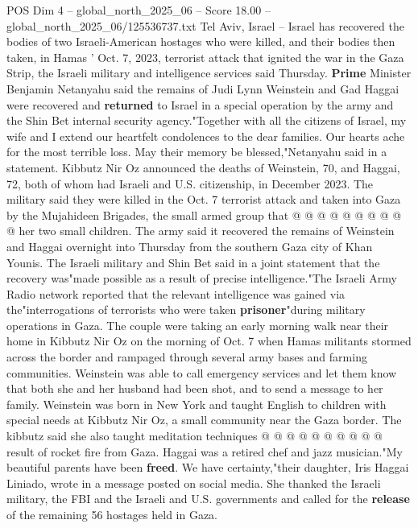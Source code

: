 \begin{textsample}{POS Dim 4 – global\_north\_2025\_06 – Score 18.00 – global\_north\_2025\_06/125536737.txt}  \label{ex:f4_pos_384}
Tel Aviv, Israel -- Israel has recovered the bodies of two Israeli-American hostages who were killed, and their bodies then taken, in Hamas ' Oct. 7, 2023, terrorist attack that ignited the war in the Gaza Strip, the Israeli military and intelligence services said Thursday. \textbf{Prime} Minister Benjamin Netanyahu said the remains of Judi Lynn Weinstein and Gad Haggai were recovered and \textbf{returned} to Israel in a special operation by the army and the Shin Bet internal security agency."Together with all the citizens of Israel, my wife and I extend our heartfelt condolences to the dear families.
Our hearts ache for the most terrible loss.
May their memory be blessed,"Netanyahu said in a statement.
Kibbutz Nir Oz announced the deaths of Weinstein, 70, and Haggai, 72, both of whom had Israeli and U.S. citizenship, in December 2023.
The military said they were killed in the Oct. 7 terrorist attack and taken into Gaza by the Mujahideen Brigades, the small armed group that @ @ @ @ @ @ @ @ @ @ her two small children.
The army said it recovered the remains of Weinstein and Haggai overnight into Thursday from the southern Gaza city of Khan Younis.
The Israeli military and Shin Bet said in a joint statement that the recovery was"made possible as a result of precise intelligence."The Israeli Army Radio network reported that the relevant intelligence was gained via the"interrogations of terrorists who were taken \textbf{prisoner}"during military operations in Gaza.
The couple were taking an early morning walk near their home in Kibbutz Nir Oz on the morning of Oct. 7 when Hamas militants stormed across the border and rampaged through several army bases and farming communities.
Weinstein was able to call emergency services and let them know that both she and her husband had been shot, and to send a message to her family.
Weinstein was born in New York and taught English to children with special needs at Kibbutz Nir Oz, a small community near the Gaza border.
The kibbutz said she also taught meditation techniques @ @ @ @ @ @ @ @ @ @ result of rocket fire from Gaza.
Haggai was a retired chef and jazz musician."My beautiful parents have been \textbf{freed}.
We have certainty,"their daughter, Iris Haggai Liniado, wrote in a message posted on social media.
She thanked the Israeli military, the FBI and the Israeli and U.S. governments and called for the \textbf{release} of the remaining 56 hostages held in Gaza.

\end{textsample}
